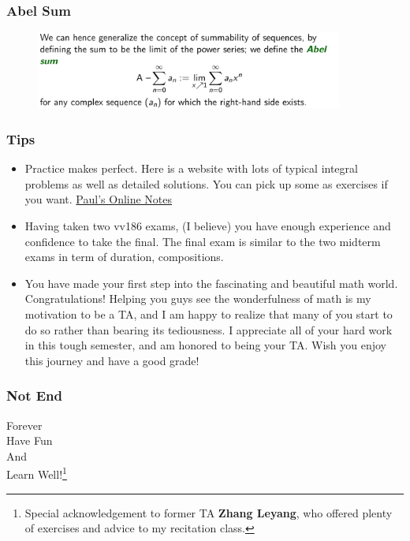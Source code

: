 \documentclass[10pt, t]{beamer}
\begin{document}
\begin{frame}
    \frametitle{Abel Sum}

    \begin{figure}[H]
        \centering
        \includegraphics[width=0.9\textwidth]{2020-12-02-14-30-21.png}
    \end{figure}

\end{frame}

\begin{frame}
    \frametitle{Tips}
    \begin{itemize}
        \item Practice makes perfect. Here is a website with lots of typical integral problems as well as detailed solutions. You can pick up some as exercises if you want. \href{https://tutorial.math.lamar.edu/Problems/CalcII/IntTechIntro.aspx}{Paul's Online Notes}
        \item Having taken two vv186 exams, (I believe) you have enough experience and confidence to take the final. The final exam is similar to the two midterm exams in term of duration, compositions.
        \item You have made your first step into the fascinating and beautiful math world. Congratulations! Helping you guys see the wonderfulness of math is my motivation to be a TA, and I am happy to realize that many of you start to do so rather than bearing its tediousness. I appreciate all of your hard work in this tough semester, and am honored to being your TA. Wish you enjoy this journey and have a good grade!
    \end{itemize}
\end{frame}

\begin{frame}
    \frametitle{Not End}
    \vspace{1cm}
    \begin{center}
        \Huge
        Forever\\
        Have Fun \\
        And \\
        Learn Well!\footnote[frame]{Special acknowledgement to former TA \textbf{Zhang Leyang}, who offered plenty of exercises and advice to my recitation class.}
    \end{center}
\end{frame}
\end{document}
